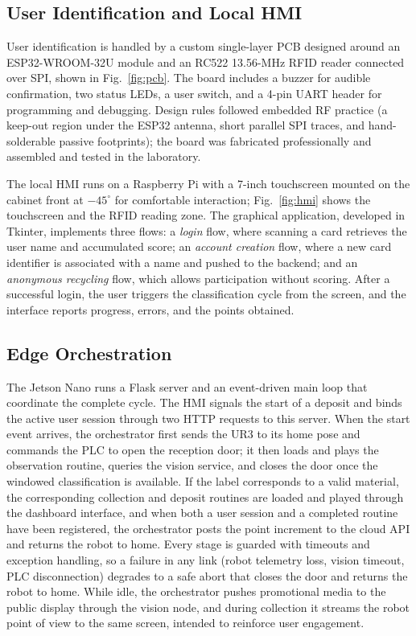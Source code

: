 \documentclass[conference]{IEEEtran}
\begin{document}
\subsection{User Identification and Local HMI}
User identification is handled by a custom single-layer PCB designed around an ESP32-WROOM-32U module and an RC522 13.56-MHz RFID reader connected over SPI, shown in Fig.~\ref{fig:pcb}. The board includes a buzzer for audible confirmation, two status LEDs, a user switch, and a 4-pin UART header for programming and debugging. Design rules followed embedded RF practice (a keep-out region under the ESP32 antenna, short parallel SPI traces, and hand-solderable passive footprints); the board was fabricated professionally and assembled and tested in the laboratory.

The local HMI runs on a Raspberry Pi with a 7-inch touchscreen mounted on the cabinet front at $-45^{\circ}$ for comfortable interaction; Fig.~\ref{fig:hmi} shows the touchscreen and the RFID reading zone. The graphical application, developed in Tkinter, implements three flows: a \emph{login} flow, where scanning a card retrieves the user name and accumulated score; an \emph{account creation} flow, where a new card identifier is associated with a name and pushed to the backend; and an \emph{anonymous recycling} flow, which allows participation without scoring. After a successful login, the user triggers the classification cycle from the screen, and the interface reports progress, errors, and the points obtained.

\subsection{Edge Orchestration}
The Jetson Nano runs a Flask server and an event-driven main loop that coordinate the complete cycle. The HMI signals the start of a deposit and binds the active user session through two HTTP requests to this server. When the start event arrives, the orchestrator first sends the UR3 to its home pose and commands the PLC to open the reception door; it then loads and plays the observation routine, queries the vision service, and closes the door once the windowed classification is available. If the label corresponds to a valid material, the corresponding collection and deposit routines are loaded and played through the dashboard interface, and when both a user session and a completed routine have been registered, the orchestrator posts the point increment to the cloud API and returns the robot to home. Every stage is guarded with timeouts and exception handling, so a failure in any link (robot telemetry loss, vision timeout, PLC disconnection) degrades to a safe abort that closes the door and returns the robot to home. While idle, the orchestrator pushes promotional media to the public display through the vision node, and during collection it streams the robot point of view to the same screen, intended to reinforce user engagement.
\end{document}
